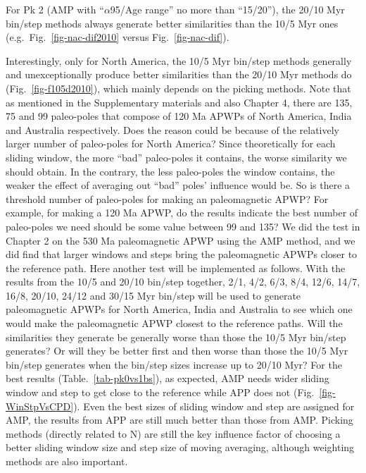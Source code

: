 For Pk 2 (AMP with ``$\alpha$95/Age range'' no more than
``15\degree/20\degree''), the 20/10 Myr bin/step methods always generate better
similarities than the 10/5 Myr ones (e.g.\ Fig.~\ref{fig-nac-dif2010} versus
Fig.~\ref{fig-nac-dif}).

Interestingly, only for North America, the 10/5 Myr bin/step methods generally
and unexceptionally produce better similarities than the 20/10 Myr methods do
(Fig.~\ref{fig-f105d2010}), which mainly depends on the picking methods. Note
that as mentioned in the Supplementary materials and also Chapter 4, there are
135, 75 and 99 paleo-poles that compose of 120 Ma APWPs of North
America, India and Australia respectively. Does the reason could be because of
the relatively larger number of paleo-poles for North America? Since
theoretically for each sliding window, the more ``bad'' paleo-poles it contains,
the worse similarity we should obtain. In the contrary, the less paleo-poles the
window contains, the weaker the effect of averaging out ``bad'' poles' influence
would be. So is there a threshold number of paleo-poles for making an
paleomagnetic APWP\@? For example, for making a 120 Ma APWP, do the
results indicate the best number of paleo-poles we need should be some value
between 99 and 135? We did the test in Chapter 2 on the 530 Ma
paleomagnetic APWP using the AMP method, and we did find that larger windows and
steps bring the paleomagnetic APWPs closer to the reference path. Here another
test will be implemented as follows. With the results from the 10/5 and 20/10
bin/step together, 2/1, 4/2, 6/3, 8/4, 12/6, 14/7, 16/8, 20/10, 24/12 and 30/15
Myr bin/step will be used to generate paleomagnetic APWPs for North America,
India and Australia to see which one would make the paleomagnetic APWP closest
to the reference paths. Will the similarities they generate be generally worse
than those the 10/5 Myr bin/step generates? Or will they be better first and
then worse than those the 10/5 Myr bin/step generates when the bin/step sizes
increase up to 20/10 Myr? For the best results (Table.~\ref{tab-pk0vs1bs}), as
expected, AMP needs wider sliding window and step to get close to the reference
while APP does not (Fig.~\ref{fig-WinStpVsCPD}). Even the best sizes of sliding
window and step are assigned for AMP, the results from APP are still much better
than those from AMP\@. Picking methods (directly related to N) are still the key
influence factor of choosing a better sliding window size and step size of
moving averaging, although weighting methods are also important.

